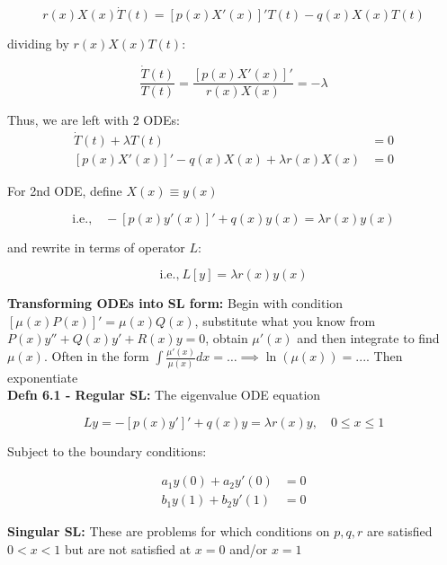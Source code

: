 \documentclass[10pt,landscape]{article}
\begin{document}
\begin{multicols}{2}
\begin{itemize}
            $$r(x)X(x)\dot{T}(t) = [p(x)X'(x)]'T(t)-q(x)X(x)T(t)$$

            dividing by $r(x)X(x)T(t):$

            $$\frac{\dot{T}(t)}{T(t)}=\frac{[p(x)X'(x)]'}{r(x)X(x)}=-\lambda$$

            Thus, we are left with 2 ODEs: \\\begin{align*}
                \dot{T}(t)+\lambda T(t) &= 0\\
                [p(x)X'(x)]'-q(x)X(x)+\lambda r(x)X(x) &=0
            \end{align*}

            For 2nd ODE, define $X(x)\equiv y(x)$

            $$\text{i.e.,}\quad -[p(x)y'(x)]'+q(x)y(x) = \lambda r(x)y(x)$$

            and rewrite in terms of operator $L$:

            $$\text{i.e.,} \ L[y] = \lambda r(x)y(x)$$
        \end{itemize}

\textbf{Transforming ODEs into SL form:}
Begin with condition $[\mu(x)P(x)]' = \mu(x)Q(x)$, substitute what you know from $P(x)y'' + Q(x)y' + R(x)y = 0$, obtain $\mu'(x)$ and then integrate to find $\mu(x)$. Often in the form $\int\frac{\mu'(x)}{\mu(x)}dx =\dots \implies \ln(\mu(x)) = ...$. Then exponentiate\\
        \medskip
        \textbf{Defn 6.1 - Regular SL:} The eigenvalue ODE equation

        $$Ly = -[p(x)y']'+q(x)y = \lambda r(x)y, \quad 0\le x \le 1$$

        Subject to the boundary conditions:

        \begin{align*}
            a_1y(0)+a_2y'(0)&=0\\
            b_1y(1)+b_2y'(1)  &=0
        \end{align*}

        \textbf{Singular SL:} These are problems for which conditions on $p, q, r$ are satisfied $0<x<1$ but are not satisfied at $x=0$ and/or $x=1$
        

\end{multicols}
\end{document}
